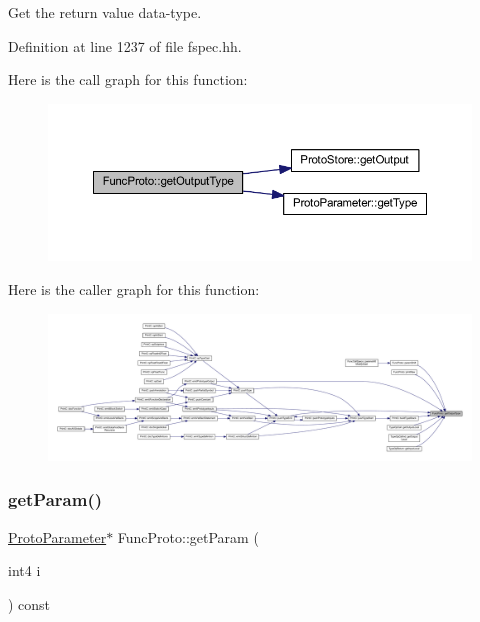 Get the return value data-\/type. 



Definition at line 1237 of file fspec.\+hh.

Here is the call graph for this function\+:
\nopagebreak
\begin{figure}[H]
\begin{center}
\leavevmode
\includegraphics[width=350pt]{class_func_proto_ad457e79208b6e7f4f030c2c325db1dba_cgraph}
\end{center}
\end{figure}
Here is the caller graph for this function\+:
\nopagebreak
\begin{figure}[H]
\begin{center}
\leavevmode
\includegraphics[width=350pt]{class_func_proto_ad457e79208b6e7f4f030c2c325db1dba_icgraph}
\end{center}
\end{figure}
\mbox{\label{class_func_proto_a3c9f97f81ec970bcd40d37f093a1765e}} 
\subsubsection{\texorpdfstring{getParam()}{getParam()}}
{\footnotesize\ttfamily \mbox{\hyperlink{class_proto_parameter}{Proto\+Parameter}}$\ast$ Func\+Proto\+::get\+Param (\begin{DoxyParamCaption}\item[{int4}]{i }\end{DoxyParamCaption}) const\hspace{0.3cm}{\ttfamily [inline]}}



